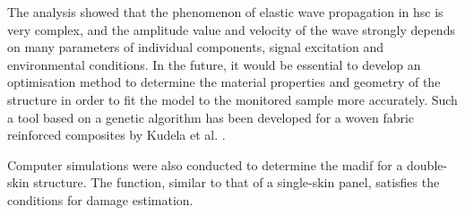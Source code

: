 The analysis showed that the phenomenon of elastic wave propagation in \ac{hsc} is very complex, and the amplitude value and velocity of the wave strongly depends on many parameters of individual components, signal excitation and environmental conditions.
In the future, it would be essential to develop an optimisation method to determine the material properties and geometry of the structure in order to fit the model to the monitored sample more accurately.
Such a tool based on a genetic algorithm has been developed for a woven fabric reinforced composites by Kudela et al. \cite{kudela2020elastic}.

Computer simulations were also conducted to determine the \ac{madif} for a double-skin structure.
The function, similar to that of a single-skin panel, satisfies the conditions for damage estimation.